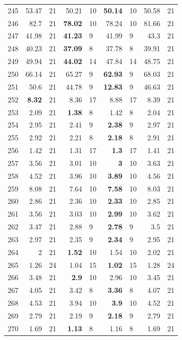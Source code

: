 \begin{longtable}{lr@{\hskip 4pt}l@{\hskip 12pt}r@{\hskip 4pt}l@{\hskip 12pt}r@{\hskip 4pt}l@{\hskip 12pt}r@{\hskip 4pt}l@{\hskip 12pt}}
245 & 53.47 & 21 & 50.21 & 10 & \textbf{50.14} & 10 & 50.58 & 21 \\
246 & 82.7 & 21 & \textbf{78.02} & 10 & 78.24 & 10 & 81.66 & 21 \\
247 & 41.98 & 21 & \textbf{41.23} & 9 & 41.99 & 9 & 43.3 & 21 \\
248 & 40.23 & 21 & \textbf{37.09} & 8 & 37.78 & 8 & 39.91 & 21 \\
249 & 49.94 & 21 & \textbf{44.02} & 14 & 47.84 & 14 & 48.75 & 21 \\
250 & 66.14 & 21 & 65.27 & 9 & \textbf{62.93} & 9 & 68.03 & 21 \\
251 & 50.6 & 21 & 44.78 & 9 & \textbf{12.83} & 9 & 46.63 & 21 \\
252 & \textbf{8.32} & 21 & 8.36 & 17 & 8.88 & 17 & 8.39 & 21 \\
253 & 2.09 & 21 & \textbf{1.38} & 8 & 1.42 & 8 & 2.04 & 21 \\
254 & 2.95 & 21 & 2.41 & 9 & \textbf{2.38} & 9 & 2.97 & 21 \\
255 & 2.92 & 21 & 2.21 & 8 & \textbf{2.18} & 8 & 2.91 & 21 \\
256 & 1.42 & 21 & 1.31 & 17 & \textbf{1.3} & 17 & 1.41 & 21 \\
257 & 3.56 & 21 & 3.01 & 10 & \textbf{3} & 10 & 3.63 & 21 \\
258 & 4.52 & 21 & 3.96 & 10 & \textbf{3.89} & 10 & 4.56 & 21 \\
259 & 8.08 & 21 & 7.64 & 10 & \textbf{7.58} & 10 & 8.03 & 21 \\
260 & 2.86 & 21 & 2.36 & 10 & \textbf{2.33} & 10 & 2.85 & 21 \\
261 & 3.56 & 21 & 3.03 & 10 & \textbf{2.99} & 10 & 3.62 & 21 \\
262 & 3.47 & 21 & 2.88 & 9 & \textbf{2.78} & 9 & 3.5 & 21 \\
263 & 2.97 & 21 & 2.35 & 9 & \textbf{2.34} & 9 & 2.95 & 21 \\
264 & 2 & 21 & \textbf{1.52} & 10 & 1.54 & 10 & 2.02 & 21 \\
265 & 1.26 & 24 & 1.04 & 15 & \textbf{1.02} & 15 & 1.28 & 24 \\
266 & 3.48 & 21 & \textbf{2.9} & 10 & 2.96 & 10 & 3.45 & 21 \\
267 & 4.05 & 21 & 3.42 & 8 & \textbf{3.36} & 8 & 4.07 & 21 \\
268 & 4.53 & 21 & 3.94 & 10 & \textbf{3.9} & 10 & 4.52 & 21 \\
269 & 2.79 & 21 & 2.19 & 9 & \textbf{2.18} & 9 & 2.79 & 21 \\
270 & 1.69 & 21 & \textbf{1.13} & 8 & 1.16 & 8 & 1.69 & 21 \\

\end{longtable}
